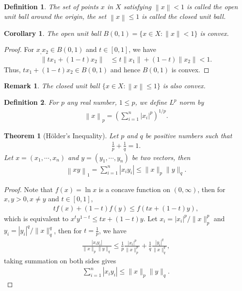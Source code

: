 \documentclass[11pt]{book}
\newtheorem{definition}{Definition}[chapter]
\newtheorem{theorem}{Theorem}[chapter]
\newtheorem{corollary}{Corollary}[theorem]
\newtheorem{remark}{Remark}[chapter]
\theoremstyle{definition}
\numberwithin{equation}{chapter}
\begin{document}
\medskip

\begin{definition}
The set of points $x$ in $X$ satisfying $\left\|x\right\| < 1$ is called the open unit ball around the origin, the set $\left\|x\right\| \leq 1$ is called the closed unit ball.
\end{definition}

\medskip

\begin{corollary}
The open unit ball $B(0,1) = \{x \in X: \|x\| < 1\}$ is convex.
\end{corollary}
\begin{proof}
For $x_, x_2 \in B(0,1)$ and $t \in [0,1]$, we have
\begin{align*}
    \|tx_1 + (1-t)x_2\| & \leq t\|x_1\| + (1-t)\|x_2\| < 1.
\end{align*}
Thus, $tx_1 + (1-t)x_2 \in B(0,1)$ and hence $B(0,1)$ is convex.
\end{proof}

\begin{remark}
The closed unit ball $\{x \in X: \left\|x\right\| \leq 1\}$ is also convex.
\end{remark}

\medskip

\begin{definition}
For $p$ any real number, $1 \leq p$, we define $L^p$ norm by 
\begin{align*}
    \left\|x\right\|_p = \left(\sum^n_{i=1} |x_i|^p \right)^{1/p}.
\end{align*}
\end{definition}

\medskip

\begin{theorem}[Hölder's Inequality]
Let $p$ and $q$ be positive numbers such that 
\begin{align*}
    \frac{1}{p} + \frac{1}{q} = 1.
\end{align*}
Let $x = (x_1, \cdots, x_n)$ and $y = (y_1, \cdots, y_n)$ be two vectors, then 
\begin{align*}
    \left\|xy\right\|_1 = \sum^n_{i=1} \left|x_i y_i\right| \leq \|x\|_p \|y\|_q.
\end{align*}
\end{theorem}
\begin{proof}
Note that $f(x) = \ln x$ is a concave function on $(0, \infty)$, then for $x, y > 0, x \neq y$ and $t \in [0,1]$, 
\begin{align*}
    t f(x) + (1-t) f(y) \leq f(tx + (1-t)y),
\end{align*}
which is equivalent to $x^t y^{1-t} \leq tx + (1-t)y$. Let $x_i =|x_i|^p/\|x\|^p_p$ and $y_i = |y_i|^q/\|x\|^q_q$, then for $t = \frac{1}{p}$, we have
\begin{align*}
    \frac{|x_i y_i|}{\|x\|_p \|y\|_q} \leq \frac{1}{p} \frac{|x_i|^p}{\|x\|^p_p} + \frac{1}{q} \frac{|y_i|^q}{\|x\|^q_q},
\end{align*}
taking summation on both sides gives
\begin{align*}
    \sum^n_{i=1} \left|x_i y_i\right| \leq \|x\|_p \|y\|_q.
\end{align*}
\end{proof}
\end{document}
